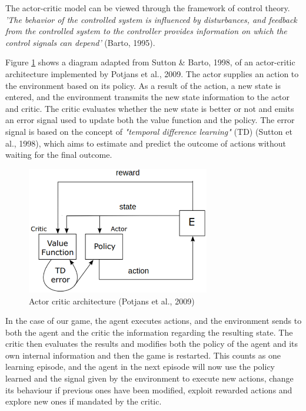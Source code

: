 \documentclass[10pt]{article}
\begin{document}
    The actor-critic model can be viewed through the framework of control theory. \textit{'The behavior of the controlled system is influenced
    by disturbances, and feedback from the controlled system to the controller provides information on which the control signals can depend'} (Barto, 1995).

    Figure \ref{fig:potjansArchitecture} shows a diagram adapted from Sutton \& Barto, 1998, of an actor-critic architecture implemented by Potjans et al., 2009. The actor supplies an action to the environment based on its policy. As a result of the action, a new state is entered, and the environment transmits the new state information to the actor and critic. The critic evaluates whether the new state is better or not and emits an error signal used to update both the value function and the policy. The error signal is based on the concept of \textit{"temporal difference learning"} (TD) (Sutton et al., 1998), which aims to estimate and predict the outcome of actions without waiting for the final outcome.

    \begin{figure}[ht!]
    \centering
    \includegraphics[width=80mm]{./actorCriticDiagram.png}
    \caption{Actor critic architecture (Potjans et al., 2009)}
    \label{fig:potjansArchitecture}
    \end{figure}

    In the case of our game, the agent executes actions, and the environment sends to both the agent and the critic the information regarding the resulting state. The critic then evaluates the results and modifies both the policy of the agent and its own internal information and then the game is restarted. This counts as one learning episode, and the agent in the next episode will now use the policy learned and the signal given by the environment to execute new actions, change its behaviour if previous ones have been modified, exploit rewarded actions and explore new ones if mandated by the critic. 
    
\end{document}
